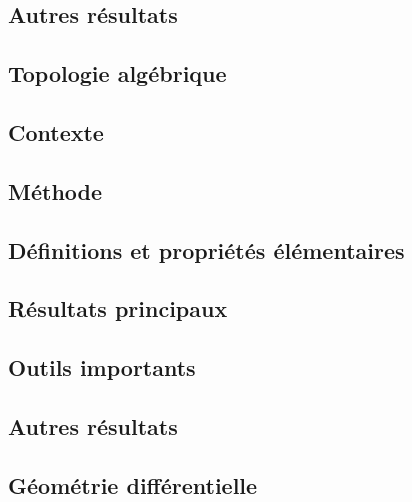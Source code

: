 \documentclass[12pt,a4paper]{article}
\begin{document}
\subsection*{Autres résultats}


\newpage
\begin{center}  
\section*{Topologie algébrique} 
\end{center}



\subsection*{Contexte}

\subsection*{Méthode}

\subsection*{Définitions et propriétés élémentaires}

\subsection*{Résultats principaux}

\subsection*{Outils importants}


\subsection*{Autres résultats}


\newpage
\begin{center}  
\section*{Géométrie différentielle} 
\end{center}

\end{document}
